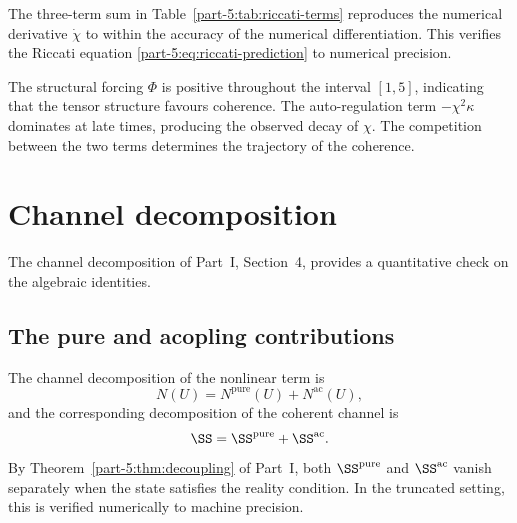 \begin{remark}[Consistency]\label{part-5:rem:riccati-consistency}
The three-term sum in Table~\ref{part-5:tab:riccati-terms} reproduces the 
numerical derivative $\dot\chi$ to within the accuracy of the 
numerical differentiation. This verifies the Riccati equation 
\eqref{part-5:eq:riccati-prediction} to numerical precision.
\end{remark}

\begin{remark}[Interpretation]\label{part-5:rem:riccati-interp}
The structural forcing $\Phi$ is positive throughout the interval 
$[1,5]$, indicating that the tensor structure favours coherence. The 
auto-regulation term $-\chi^2\kappa$ dominates at late times, 
producing the observed decay of $\chi$. The competition between the 
two terms determines the trajectory of the coherence.
\end{remark}

\section{Channel decomposition}
\label{part-5:sec:channel-numeric}

The channel decomposition of Part~I, Section~4, provides a 
quantitative check on the algebraic identities.

\subsection{The pure and acopling contributions}
\label{part-5:ssec:pure-ac}

The channel decomposition of the nonlinear term is
\begin{equation}\label{part-5:eq:decomp-verify}
N(U) = N^{\mathrm{pure}}(U) + N^{\mathrm{ac}}(U),
\end{equation}
and the corresponding decomposition of the coherent channel is
\begin{equation}\label{part-5:eq:S-decomp}
\SS = \SS^{\mathrm{pure}} + \SS^{\mathrm{ac}}.
\end{equation}
By Theorem~\ref{part-5:thm:decoupling} of Part~I, both 
$\SS^{\mathrm{pure}}$ and $\SS^{\mathrm{ac}}$ vanish separately when 
the state satisfies the reality condition. In the truncated setting, 
this is verified numerically to machine precision.

